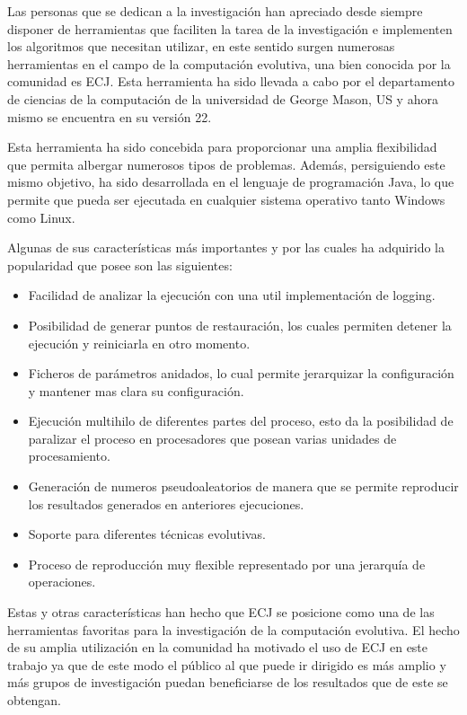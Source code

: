 Las personas que se dedican a la investigación han apreciado desde siempre disponer de herramientas que faciliten la tarea de la investigación e implementen los algoritmos que necesitan utilizar, en este sentido surgen numerosas herramientas en el campo de la computación evolutiva, una bien conocida por la comunidad es ECJ. Esta herramienta ha sido llevada a cabo por el departamento de ciencias de la computación de la universidad de George Mason, US y ahora mismo se encuentra en su versi\'on 22.

Esta herramienta ha sido concebida para proporcionar una amplia flexibilidad que permita albergar numerosos tipos de problemas. Adem\'as, persiguiendo este mismo objetivo, ha sido desarrollada en el lenguaje de programación Java, lo que permite que pueda ser ejecutada en cualquier sistema operativo tanto Windows como Linux.

Algunas de sus características m\'as importantes y por las cuales ha adquirido la popularidad que posee son las siguientes:

\begin{itemize}
	\item Facilidad de analizar la ejecución con una util implementación de logging.
	\item Posibilidad de generar puntos de restauración, los cuales permiten detener la ejecución y reiniciarla en otro momento.
	\item Ficheros de parámetros anidados, lo cual permite jerarquizar la configuración y mantener mas clara su configuración.
	\item Ejecución multihilo de diferentes partes del proceso, esto da la posibilidad de paralizar el proceso en procesadores que posean varias unidades de procesamiento.
	\item Generación de numeros pseudoaleatorios de manera que se permite reproducir los resultados generados en anteriores ejecuciones.
	\item Soporte para diferentes técnicas evolutivas.
	\item Proceso de reproducción muy flexible representado por una jerarquía de operaciones.
\end{itemize}

Estas y otras características han hecho que ECJ se posicione como una de las herramientas favoritas para la investigación de la computación evolutiva. El hecho de su amplia utilización en la comunidad ha motivado el uso de ECJ en este trabajo ya que de este modo el p\'ublico al que puede ir dirigido es m\'as amplio y m\'as grupos de investigación puedan beneficiarse de los resultados que de este se obtengan.

